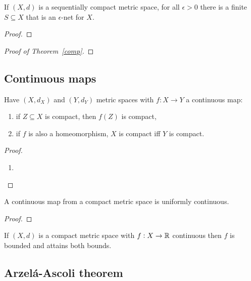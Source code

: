 \documentclass[../Year2.tex]{subfiles}
\begin{document}
\begin{lemma}
    If $(X,d)$ is a sequentially compact metric space, for all $\epsilon>0$ there is a finite $S\subseteq X$ that is an $\epsilon$-net for $X$. \begin{proof}
        
    \end{proof}
\end{lemma}

\begin{proof}[Proof of Theorem~\ref{comp}]
    
\end{proof}

\subsection{Continuous maps}

\begin{proposition}
    Have $(X,d_X)$ and $(Y,d_Y)$ metric spaces with $f:X\rightarrow Y$ a continuous map: \begin{enumerate}
        \item if $Z\subseteq X$ is compact, then $f(Z)$ is compact,
        \item if $f$ is also a homeomorphism, $X$ is compact iff $Y$ is compact.
    \end{enumerate}
    \begin{proof}
        \begin{enumerate}
            \item 
        \end{enumerate}
    \end{proof}
\end{proposition}

\begin{corollary}
    A continuous map from a compact metric space is uniformly continuous.
    \begin{proof}
        
    \end{proof}
\end{corollary}

\begin{corollary}
    If $(X,d)$ is a compact metric space with $f:X\rightarrow\mathbb{R}$ continuous then $f$ is bounded and attains both bounds.
\end{corollary}

\subsection{Arzelá-Ascoli theorem}
\end{document}
